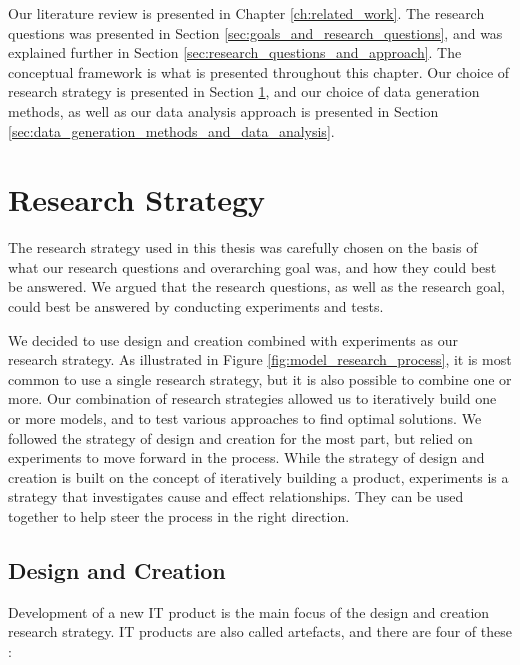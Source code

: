 Our literature review is presented in Chapter \ref{ch:related_work}. The research questions was presented in Section \ref{sec:goals_and_research_questions}, and was explained further in Section \ref{sec:research_questions_and_approach}. The conceptual framework is what is presented throughout this chapter. Our choice of research strategy is presented in Section \ref{sec:research_strategy}, and our choice of data generation methods, as well as our data analysis approach is presented in Section \ref{sec:data_generation_methods_and_data_analysis}.


\section{Research Strategy}
\label{sec:research_strategy}
The research strategy used in this thesis was carefully chosen on the basis of what our research questions and overarching goal was, and how they could best be answered. We argued that the research questions, as well as the research goal, could best be answered by conducting experiments and tests. 

We decided to use design and creation combined with experiments as our research strategy. As illustrated in Figure \ref{fig:model_research_process}, it is most common to use a single research strategy, but it is also possible to combine one or more. Our combination of research strategies allowed us to iteratively build one or more models, and to test various approaches to find optimal solutions. We followed the strategy of design and creation for the most part, but relied on experiments to move forward in the process. While the strategy of design and creation is built on the concept of iteratively building a product, experiments is a strategy that investigates cause and effect relationships. They can be used together to help steer the process in the right direction.

\subsection{Design and Creation}
\label{sec:design_and_creation}
Development of a new IT product is the main focus of the design and creation research strategy. IT products are also called artefacts, and there are four of these \citep{march1995design, oates2005researching}:

